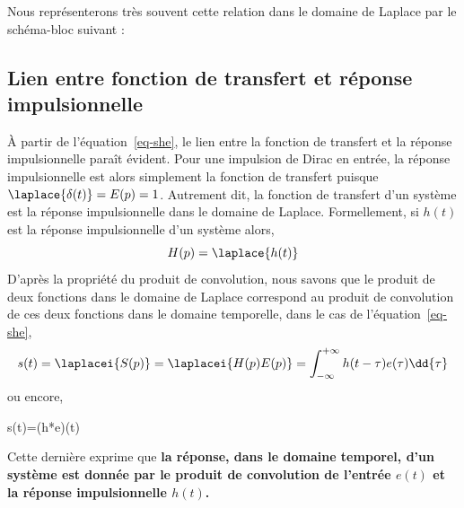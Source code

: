 Nous représenterons très souvent cette relation dans le domaine de Laplace 
par le schéma-bloc suivant : 
\begin{center}
    
\end{center}
\subsection{Lien entre fonction de transfert et réponse impulsionnelle}
À partir de l'équation~\ref{eq-she}, le lien entre la fonction de transfert
et la réponse impulsionnelle paraît évident. Pour une impulsion de Dirac 
en entrée, la réponse impulsionnelle est alors simplement la fonction 
de transfert puisque $\laplace{\delta(t)}=E(p)=1$. Autrement dit, 
la fonction de transfert d'un système est la réponse impulsionnelle 
dans le domaine de Laplace. Formellement, si $h(t)$ est la réponse 
impulsionnelle d'un système alors,
\[
    H(p) = \laplace{h(t)}
\]
D'après la propriété du produit de convolution, nous savons que 
le produit de deux fonctions dans le domaine de Laplace correspond au 
produit de convolution de ces deux fonctions dans le domaine temporelle, 
dans le cas de l'équation~\ref{eq-she},
\[
    s(t)=\laplacei{S(p)}=\laplacei{H(p)E(p)}
    =\int_{-\infty}^{+\infty}h(t-\tau)e(\tau)\dd{\tau}
\]
ou encore,
\begin{bequation}
    s(t)=(h*e)(t)
\end{bequation}
Cette dernière exprime que \textbf{la réponse, dans le domaine temporel, 
d'un système est donnée par le 
produit de convolution de l'entrée $e(t)$ et la réponse impulsionnelle $h(t)$.}
